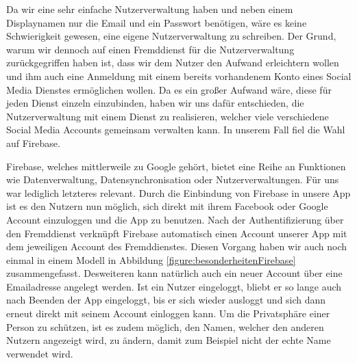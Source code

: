 Da wir eine sehr einfache Nutzerverwaltung haben und neben einem Displaynamen nur die Email und ein Passwort benötigen, wäre es keine Schwierigkeit gewesen, eine eigene Nutzerverwaltung zu schreiben. Der Grund, warum wir dennoch auf einen Fremddienst für die Nutzerverwaltung zurückgegriffen haben ist, dass wir dem Nutzer den Aufwand erleichtern wollen und ihm auch eine Anmeldung mit einem bereits vorhandenem Konto eines Social Media Dienstes ermöglichen wollen. Da es ein großer Aufwand wäre, diese für jeden Dienst einzeln einzubinden, haben wir uns dafür entschieden, die Nutzerverwaltung mit einem Dienst zu realisieren, welcher viele verschiedene Social Media Accounts gemeinsam verwalten kann. In unserem Fall fiel die Wahl auf Firebase.

Firebase, welches mittlerweile zu Google gehört, bietet eine Reihe an Funktionen wie Datenverwaltung, Datensynchronisation oder Nutzerverwaltungen. Für uns war lediglich letzteres relevant. Durch die Einbindung von Firebase in unsere App ist es den Nutzern nun möglich, sich direkt mit ihrem Facebook oder Google Account einzuloggen und die App zu benutzen. Nach der Authentifizierung über den Fremddienst verknüpft Firebase automatisch einen Account unserer App mit dem jeweiligen Account des Fremddienstes. Diesen Vorgang haben wir auch noch einmal in einem Modell in Abbildung \ref{figure:besonderheitenFirebase} zusammengefasst. Desweiteren kann natürlich auch ein neuer Account über eine Emailadresse angelegt werden. Ist ein Nutzer eingeloggt, bliebt er so lange auch nach Beenden der App eingeloggt, bis er sich wieder ausloggt und sich dann erneut direkt mit seinem Account einloggen kann. Um die Privatsphäre einer Person zu schützen, ist es zudem möglich, den Namen, welcher den anderen Nutzern angezeigt wird, zu ändern, damit zum Beispiel nicht der echte Name verwendet wird.

